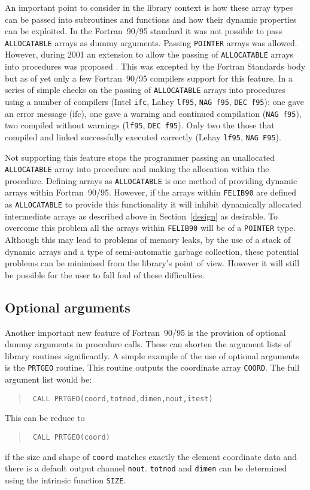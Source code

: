 \documentclass[a4paper,titlepage,11pt]{article}
\begin{document}
An important point to consider in the library context is how these array types can
be passed into subroutines and functions and how their dynamic properties can
be exploited. In the Fortran~90/95 standard it was not possible to pass {\tt ALLOCATABLE}
arrays as dummy arguments. Passing {\tt POINTER} arrays was allowed. However, during
2001 an extension to allow the passing of {\tt ALLOCATABLE} arrays into procedures
was proposed \cite{cohen}. This was excepted by the Fortran Standards body but
as of yet only a few Fortran~90/95 compilers support for this feature. In a series
of simple checks on the passing of {\tt ALLOCATABLE} arrays into procedures using
a number of compilers (Intel {\tt ifc}, Lahey {\tt lf95}, {\tt NAG f95}, {\tt DEC f95}):
one gave an error message (ifc), one gave a warning and continued compilation ({\tt NAG f95}), 
two compiled without warnings ({\tt lf95}, {\tt DEC f95}). Only two the those that compiled and
linked successfully executed correctly (Lehay {\tt lf95}, {\tt NAG F95}).

Not supporting this feature stops the programmer passing an unallocated
{\tt ALLOCATABLE} array into procedure and making the allocation within 
the procedure. Defining arrays as {\tt ALLOCATABLE} is one method of
providing dynamic arrays within Fortran~90/95. However, if the arrays within {\tt FELIB90} 
are defined as {\tt ALLOCATABLE} to provide this functionality it will inhibit 
dynamically allocated intermediate arrays as described above
in Section~\ref{design} as desirable. To overcome this
problem all the arrays within {\tt FELIB90} will be of a {\tt POINTER} type. Although
this may lead to problems of memory leaks, by the use of a stack of dynamic arrays
and a type of semi-automatic garbage collection, these potential problems can
be minimised from the library's point of view. However it will still be
possible for the user to fall foul of these difficulties.

\subsection{Optional arguments}
Another important new feature of Fortran~90/95 is the provision of optional dummy arguments
in procedure calls. These can shorten the argument lists of library routines
significantly. A simple example of the use of optional arguments is the
{\tt PRTGEO} routine. This routine outputs the coordinate array {\tt COORD}. The
full argument list would be:
\begin{quote}
\tt\source
CALL PRTGEO(coord,totnod,dimen,nout,itest)
\end{quote}
This can be reduce to
\begin{quote}
\tt\source
CALL PRTGEO(coord)
\end{quote}
if the size and shape of {\tt coord} matches exactly the element coordinate data and 
there is a default output channel {\tt nout}. {\tt totnod} and {\tt dimen} can be
determined using the intrinsic function {\tt SIZE}.
\end{document}
